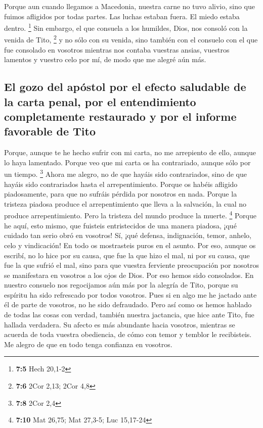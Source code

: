  Porque aun cuando llegamos a Macedonia, nuestra carne no
tuvo alivio, sino que fuimos afligidos por todas partes. Las luchas
estaban fuera. El miedo estaba dentro. \footnote{\textbf{7:5} Hech
  20,1-2}  Sin embargo, el que consuela a los humildes,
Dios, nos consoló con la venida de Tito, \footnote{\textbf{7:6} 2Cor
  2,13; 2Cor 4,8}  y no sólo con su venida, sino también
con el consuelo con el que fue consolado en vosotros mientras nos
contaba vuestras ansias, vuestros lamentos y vuestro celo por mí, de
modo que me alegré aún más.

\hypertarget{el-gozo-del-apuxf3stol-por-el-efecto-saludable-de-la-carta-penal-por-el-entendimiento-completamente-restaurado-y-por-el-informe-favorable-de-tito}{%
\subsection{El gozo del apóstol por el efecto saludable de la carta
penal, por el entendimiento completamente restaurado y por el informe
favorable de
Tito}\label{el-gozo-del-apuxf3stol-por-el-efecto-saludable-de-la-carta-penal-por-el-entendimiento-completamente-restaurado-y-por-el-informe-favorable-de-tito}}

 Porque, aunque te he hecho sufrir con mi carta, no me
arrepiento de ello, aunque lo haya lamentado. Porque veo que mi carta os
ha contrariado, aunque sólo por un tiempo. \footnote{\textbf{7:8} 2Cor
  2,4}  Ahora me alegro, no de que hayáis sido
contrariados, sino de que hayáis sido contrariados hasta el
arrepentimiento. Porque os habéis afligido piadosamente, para que no
sufráis pérdida por nosotros en nada.  Porque la tristeza
piadosa produce el arrepentimiento que lleva a la salvación, la cual no
produce arrepentimiento. Pero la tristeza del mundo produce la muerte.
\footnote{\textbf{7:10} Mat 26,75; Mat 27,3-5; Luc 15,17-24}
 Porque he aquí, esto mismo, que fuisteis entristecidos
de una manera piadosa, ¡qué cuidado tan serio obró en vosotros! Sí, ¡qué
defensa, indignación, temor, anhelo, celo y vindicación! En todo os
mostrasteis puros en el asunto.  Por eso, aunque os
escribí, no lo hice por su causa, que fue la que hizo el mal, ni por su
causa, que fue la que sufrió el mal, sino para que vuestra ferviente
preocupación por nosotros se manifestara en vosotros a los ojos de Dios.
 Por eso hemos sido consolados. En nuestro consuelo nos
regocijamos aún más por la alegría de Tito, porque su espíritu ha sido
refrescado por todos vosotros.  Pues si en algo me he
jactado ante él de parte de vosotros, no he sido defraudado. Pero así
como os hemos hablado de todas las cosas con verdad, también nuestra
jactancia, que hice ante Tito, fue hallada verdadera.  Su
afecto es más abundante hacia vosotros, mientras se acuerda de toda
vuestra obediencia, de cómo con temor y temblor le recibisteis.
 Me alegro de que en todo tenga confianza en vosotros.

